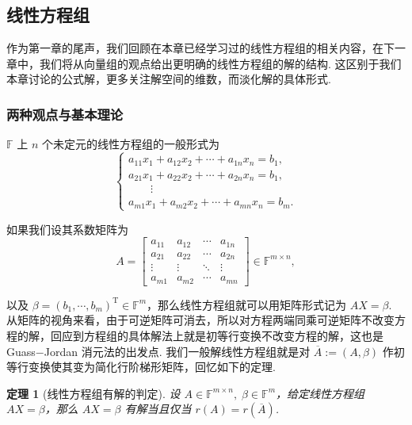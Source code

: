 \documentclass[10pt,openany]{article}
\theoremstyle{thmstyle} %
\newtheorem{theorem}{定理}[subsection]
\theoremstyle{defstyle} %
\theoremstyle{prostyle} %
\theoremstyle{exastyle}
\theoremstyle{remstyle}
\newcommand{\T}{^{\text{T}}}
\newcommand{\F}{\mathbb{F}}
\newcommand{\mn}{^{m \times n}}
\begin{document}
\subsection{线性方程组}

作为第一章的尾声，我们回顾在本章已经学习过的线性方程组的相关内容，在下一章中，我们将从向量组的观点给出更明确的线性方程组的解的结构. 这区别于我们本章讨论的公式解，更多关注解空间的维数，而淡化解的具体形式. 

\subsubsection{两种观点与基本理论}

\( \F \) 上 \( n \) 个未定元的线性方程组的一般形式为
\begin{equation}
	\left\{\begin{array}{l}
		a_{11}x_1+a_{12}x_2+\cdots+a_{1n}x_n=b_1, \\
		a_{21}x_1+a_{22}x_2+\cdots+a_{2n}x_n=b_1, \\
		\qquad \vdots \\
		a_{m1}x_1+a_{m2}x_2+\cdots+a_{mn}x_n=b_m.
	\end{array}\right.
	\label{linequ.}
\end{equation}

如果我们设其系数矩阵为
\[ A=\begin{bmatrix}
	a_{11} & a_{12} & \cdots & a_{1n} \\
	a_{21} & a_{22} & \cdots & a_{2n} \\
	\vdots & \vdots & \ddots & \vdots \\
	a_{m1} & a_{m2} & \cdots & a_{mn}
\end{bmatrix} \in \F^{m \times n}, \]

以及 \( \beta=(b_1,\cdots,b_m)\T \in \F^m \)，那么线性方程组就可以用矩阵形式记为 \( AX=\beta \). 从矩阵的视角来看，由于可逆矩阵可消去，所以对方程两端同乘可逆矩阵不改变方程的解，回应到方程组的具体解法上就是初等行变换不改变方程的解，这也是 Guass\(-\)Jordan 消元法的出发点. 我们一般解线性方程组就是对 \( \overline{A}:=(A,\beta) \) 作初等行变换使其变为简化行阶梯形矩阵，回忆如下的定理.

\begin{theorem}[线性方程组有解的判定]	\label{4.3.1}
	设 \( A \in \F\mn, \; \beta \in \F^m \)，给定线性方程组 \( AX=\beta \)，那么 \( AX=\beta \) 有解当且仅当 \( r(A)=r(\overline{A}) \).
\end{theorem}
\end{document}

